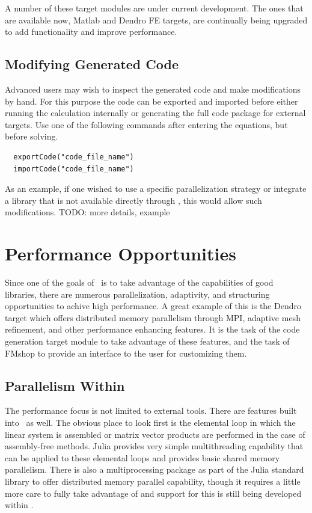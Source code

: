 \documentclass[twoside,leqno,twocolumn]{article}
\begin{document}
A number of these target modules are under current development. The ones that are available now, Matlab and Dendro FE targets, are continually being upgraded to add functionality and improve performance.

\subsection{Modifying Generated Code}
Advanced users may wish to inspect the generated code and make modifications by hand. For this purpose the code can be exported and imported before either running the calculation internally or generating the full code package for external targets. Use one of the following commands after entering the equations, but before solving.
\begin{verbatim}
  exportCode("code_file_name")
  importCode("code_file_name")
\end{verbatim}

As an example, if one wished to use a specific parallelization strategy or integrate a library that is not available directly through \FMshop, this would allow such modifications. TODO: more details, example

\section{Performance Opportunities}
Since one of the goals of \FMshop\ is to take advantage of the capabilities of good libraries, there are numerous parallelization, adaptivity, and structuring opportunities to achive high performance. A great example of this is the Dendro target which offers distributed memory parallelism through MPI, adaptive mesh refinement, and other performance enhancing features. It is the task of the code generation target module to take advantage of these features, and the task of FMshop to provide an interface to the user for customizing them.

\subsection{Parallelism Within \FMshop}
The performance focus is not limited to external tools. There are features built into \FMshop\ as well. The obvious place to look first is the elemental loop in which the linear system is assembled or matrix vector products are performed in the case of assembly-free methods. Julia provides very simple multithreading capability that can be applied to these elemental loops and provides basic shared memory parallelism. There is also a multiprocessing package as part of the Julia standard library to offer distributed memory parallel capability, though it requires a little more care to fully take advantage of and support for this is still being developed within \FMshop. 
\end{document}
